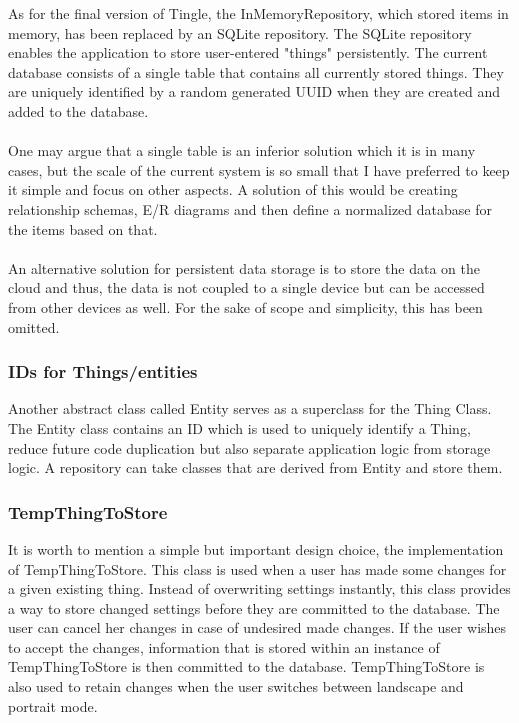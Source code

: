 \documentclass{article}
\begin{document}
As for the final version of Tingle, the InMemoryRepository, which stored items in memory, has been replaced by an SQLite repository. The SQLite repository enables the application to store user-entered "things" persistently. The current database consists of a single table that contains all currently stored things. They are uniquely identified by a random generated UUID when they are created and added to the database.\\\\One may argue that a single table is an inferior solution which it is in many cases, but the scale of the current system is so small that I have preferred to keep it simple and focus on other aspects. A solution of this would be creating relationship schemas, E/R diagrams and then define a normalized database for the items based on that.\\\\ An alternative solution for persistent data storage is to store the data on the cloud and thus, the data is not coupled to a single device but can be accessed from other devices as well. For the sake of scope and simplicity, this has been omitted.

\subsubsection{IDs for Things/entities}
Another abstract class called Entity serves as a superclass for the Thing Class. The Entity class contains an ID which is used to uniquely identify a Thing, reduce future code duplication but also separate application logic from storage logic. A repository can take classes that are derived from Entity and store them.


\subsubsection{TempThingToStore}
It is worth to mention a simple but important design choice, the implementation of TempThingToStore. This class is used when a user has made some changes for a given existing thing. Instead of overwriting settings instantly, this class provides a way to store changed settings before they are committed to the database. The user can cancel her changes in case of undesired made changes. If the user wishes to accept the changes, information that is stored within an instance of TempThingToStore is then committed to the database. TempThingToStore is also used to retain changes when the user switches between landscape and portrait mode.
\end{document}
